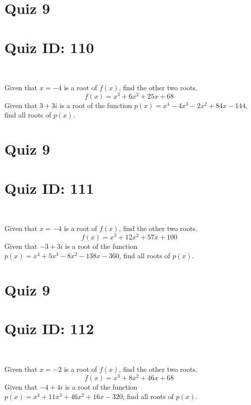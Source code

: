 \documentclass{exam}
\begin{document}
\section*{Quiz 9}
\section*{Quiz ID: 110}
\vspace{0.5cm}\
\vspace{1cm}\
\begin{questions}
\question Given that $x=-4$ is a root of $f(x)$, find the other two roots.\[f(x)=
x^3 + 6x^2 + 25x + 68\]
\newpage
\question Given that $3+3\mathit{i}$ is a root of the function $p(x)=
x^4 - 4x^3 - 2x^2 + 84x - 144$, find all roots of $p(x)$. 
\end{questions}\newpage
\newpage
\section*{Quiz 9}
\section*{Quiz ID: 111}
\vspace{0.5cm}\
\vspace{1cm}\
\begin{questions}
\question Given that $x=-4$ is a root of $f(x)$, find the other two roots.\[f(x)=
x^3 + 12x^2 + 57x + 100\]
\newpage
\question Given that $-3+3\mathit{i}$ is a root of the function $p(x)=
x^4 + 5x^3 - 8x^2 - 138x - 360$, find all roots of $p(x)$. \makeemptybox{\stretch{1}}
\end{questions}\newpage
\newpage
\section*{Quiz 9}
\section*{Quiz ID: 112}
\vspace{0.5cm}\
\vspace{1cm}\
\begin{questions}
\question Given that $x=-2$ is a root of $f(x)$, find the other two roots.\[f(x)=
x^3 + 8x^2 + 46x + 68\]
\newpage
\question Given that $-4+4\mathit{i}$ is a root of the function $p(x)=
x^4 + 11x^3 + 46x^2 + 16x - 320$, find all roots of $p(x)$. \makeemptybox{\stretch{1}}
\end{questions}\newpage
\newpage
\end{document}
